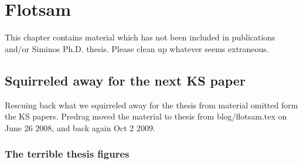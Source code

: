 %

\chapter{Flotsam}

This chapter contains material which has not been included in
publications and/or Siminos Ph.D. thesis. Please clean up
whatever seems extraneous.

\section{Squirreled away for the next KS paper}

Rescuing back what we squirreled away for the thesis from
material omitted form the KS papers. Predrag moved the
material to thesis from blog/flotsam.tex on June 26 2008, and
back again Oct  2 2009.

\subsection{The terrible thesis figures}

